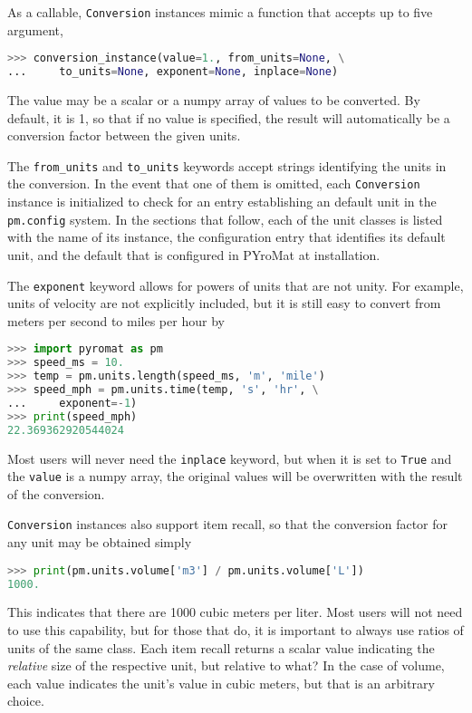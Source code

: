 As a callable, \verb|Conversion| instances mimic a function that accepts up to five argument,
\begin{lstlisting}[language=Python]
>>> conversion_instance(value=1., from_units=None, \
...     to_units=None, exponent=None, inplace=None)
\end{lstlisting}

The value may be a scalar or a numpy array of values to be converted.  By default, it is 1, so that if no value is specified, the result will automatically be a conversion factor between the given units.

The \verb|from_units| and \verb|to_units| keywords accept strings identifying the units in the conversion.  In the event that one of them is omitted, each \verb|Conversion| instance is initialized to check for an entry establishing an default unit in the \verb|pm.config| system.  In the sections that follow, each of the unit classes is listed with the name of its instance, the configuration entry that identifies its default unit, and the default that is configured in PYroMat at installation.

The \verb|exponent| keyword allows for powers of units that are not unity.  For example, units of velocity are not explicitly included, but it is still easy to convert from meters per second to miles per hour by
\begin{lstlisting}[language=Python]
>>> import pyromat as pm
>>> speed_ms = 10.
>>> temp = pm.units.length(speed_ms, 'm', 'mile')
>>> speed_mph = pm.units.time(temp, 's', 'hr', \
...     exponent=-1)
>>> print(speed_mph)
22.369362920544024
\end{lstlisting}

Most users will never need the \verb|inplace| keyword, but when it is set to \verb|True| and the \verb|value| is a numpy array, the original values will be overwritten with the result of the conversion.  

\verb|Conversion| instances also support item recall, so that the conversion factor for any unit may be obtained simply
\begin{lstlisting}[language=Python]
>>> print(pm.units.volume['m3'] / pm.units.volume['L'])
1000.
\end{lstlisting}
This indicates that there are 1000 cubic meters per liter.  Most users will not need to use this capability, but for those that do, it is important to always use ratios of units of the same class.  Each item recall returns a scalar value indicating the \emph{relative} size of the respective unit, but relative to what?  In the case of volume, each value indicates the unit's value in cubic meters, but that is an arbitrary choice.

